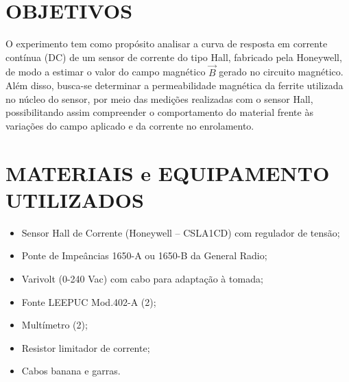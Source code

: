 \documentclass[10pt,twocolumn,letterpaper]{article}
\begin{document}

\section{OBJETIVOS}

\hspace{1cm} O experimento tem como propósito analisar a curva de resposta em corrente contínua (DC) de um sensor de corrente do tipo Hall, fabricado pela Honeywell, de modo a estimar o valor do campo magnético $\vec{B}$ gerado no circuito magnético. Além disso, busca-se determinar a permeabilidade magnética da ferrite utilizada no núcleo do sensor, por meio das medições realizadas com o sensor Hall, possibilitando assim compreender o comportamento do material frente às variações do campo aplicado e da corrente no enrolamento.



\section{MATERIAIS e EQUIPAMENTO UTILIZADOS}

\begin{itemize}
    \item Sensor Hall de Corrente (Honeywell – CSLA1CD) com
regulador de tensão;
    \item Ponte de Impeâncias 1650-A ou 1650-B da General
    Radio;
    \item Varivolt (0-240 Vac) com cabo para adaptação à tomada;
    \item Fonte LEEPUC Mod.402-A (2);
    \item Multímetro (2);
    \item Resistor limitador de corrente;
    \item Cabos banana e garras.
\end{itemize}
\end{document}
